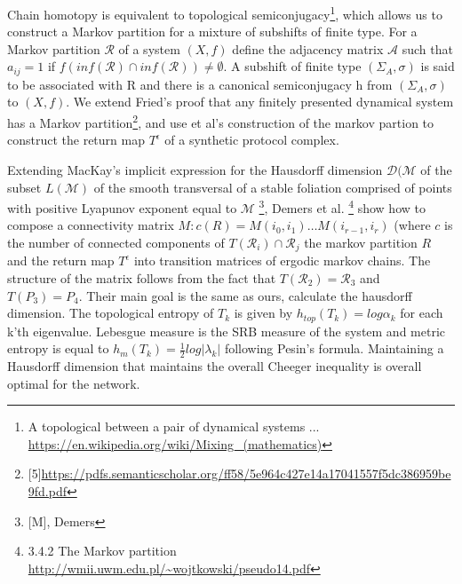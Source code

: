 \documentclass{article}
\begin{document}
Chain homotopy is equivalent to topological semiconjugacy\footnote{A topological  between a pair of dynamical systems ... \url{https://en.wikipedia.org/wiki/Mixing_(mathematics)}}, which allows us to construct a Markov partition for a mixture of subshifts of finite type. For a Markov partition $\mathcal{R}$ of a system $(X, f)$ define the adjacency matrix $\mathcal{A}$ such that $a_{ij} = 1$ if $f(inf(\mathcal{R}) \cap inf(\mathcal{R})) \neq \emptyset$. A subshift of finite type $(\Sigma_A, \sigma)$ is said to be associated with R and there is a canonical semiconjugacy h from $(\Sigma_A, \sigma)$ to $(X, f)$. We extend Fried's proof that any finitely presented dynamical system has a Markov partition\footnote{[5]\url{https://pdfs.semanticscholar.org/ff58/5e964c427e14a17041557f5dc386959be9fd.pdf}}, and use et al's construction of the markov partion to construct the return map $T^{\epsilon}$ of a synthetic protocol complex.

Extending MacKay's implicit expression for the Hausdorff dimension $\mathcal{D}(\mathcal{M}$ of the subset $L(\mathcal{M})$ of the smooth transversal of a stable foliation comprised of points with positive Lyapunov exponent equal to $\mathcal{M}$ \footnote{[M], Demers}, Demers et al. \footnote{3.4.2 The Markov partition \url{http://wmii.uwm.edu.pl/~wojtkowski/pseudo14.pdf}} show how to compose a connectivity matrix $M: c(R) = M(i_0, i_1) \dots M(i_{r-1}, i_r)$ (where $c$ is the number of connected components of $T(\mathcal{R}_i) \cap \mathcal{R}_j $ the markov partition $R$ and the return map 
$T^{\epsilon}$ into transition matrices of ergodic markov chains. The structure of the matrix follows from the fact that $T(\mathcal{R}_2) = \mathcal{R}_3$ and $T(P_3) = P_4$. Their main goal is the same as ours, calculate the hausdorff dimension. The topological entropy of $T_k$ is given by $h_{top}(T_k) = log \alpha_k$ for each k'th eigenvalue. Lebesgue measure is the SRB measure of the system and metric entropy is equal to $h_m(T_k) = \frac{1}{2}log |\lambda_k|$ following Pesin’s formula. Maintaining a Hausdorff dimension that maintains the overall Cheeger inequality is overall optimal for the network.
\end{document}
